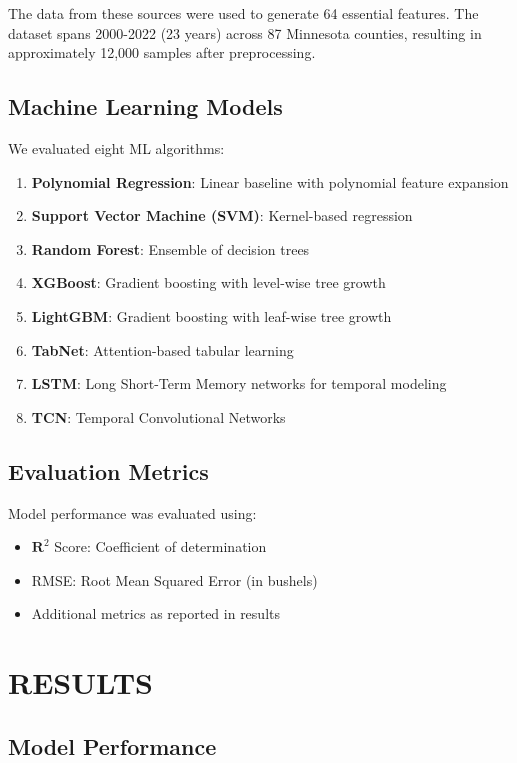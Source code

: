\documentclass[10pt,twocolumn]{article}
\begin{document}
The data from these sources were used to generate 64 essential features. The dataset spans 2000-2022 (23 years) across 87 Minnesota counties, resulting in approximately 12,000 samples after preprocessing.

\subsection{Machine Learning Models}

We evaluated eight ML algorithms:

\begin{enumerate}
    \item \textbf{Polynomial Regression}: Linear baseline with polynomial feature expansion
    \item \textbf{Support Vector Machine (SVM)}: Kernel-based regression
    \item \textbf{Random Forest}: Ensemble of decision trees
    \item \textbf{XGBoost}: Gradient boosting with level-wise tree growth
    \item \textbf{LightGBM}: Gradient boosting with leaf-wise tree growth
    \item \textbf{TabNet}: Attention-based tabular learning \cite{arik2021}
    \item \textbf{LSTM}: Long Short-Term Memory networks for temporal modeling
    \item \textbf{TCN}: Temporal Convolutional Networks \cite{bai2018}
\end{enumerate}

\subsection{Evaluation Metrics}

Model performance was evaluated using:
\begin{itemize}
    \item $\mathbf{R}^{2}$ Score: Coefficient of determination
    \item RMSE: Root Mean Squared Error (in bushels)
    \item Additional metrics as reported in results
\end{itemize}

\section{RESULTS}

\subsection{Model Performance}
\end{document}
